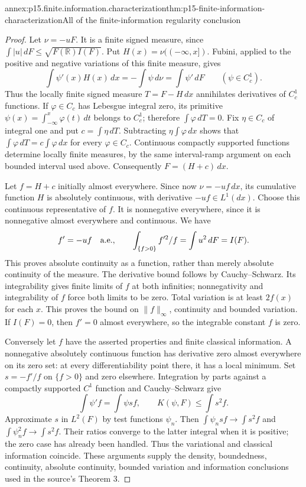 \begin{annexitem}{annex:p15.finite.information.characterization}{thm:p15-finite-information-characterization}{All of the finite-information regularity conclusion}
\begin{proof}
Let \(\nu=-uF\). It is a finite signed measure, since
\(\int|u|\,dF\leq\sqrt{F(\mathbb R)I(F)}\).
Put \(H(x)=\nu((-\infty,x])\). Fubini, applied to the positive
and negative variations of this finite measure, gives
\[
 \int\psi'(x)H(x)\,dx=-\int\psi\,d\nu
                  =\int\psi'\,dF\qquad(\psi\in C_c^1).
\]
Thus the locally finite signed measure \(T=F-H\,dx\) annihilates
derivatives of \(C_c^1\) functions. If \(\varphi\in C_c\) has
Lebesgue integral zero, its primitive
\(\psi(x)=\int_{-\infty}^x\varphi(t)\,dt\) belongs to \(C_c^1\);
therefore \(\int\varphi\,dT=0\).
Fix \(\eta\in C_c\) of integral one and put \(c=\int\eta\,dT\).
Subtracting \(\eta\int\varphi\,dx\) shows that
\(\int\varphi\,dT=c\int\varphi\,dx\) for every \(\varphi\in C_c\).
Continuous compactly supported functions determine locally finite
measures, by the same interval-ramp argument on each bounded interval
used above. Consequently \(F=(H+c)\,dx\).

Let \(f=H+c\) initially almost everywhere. Since now
\(\nu=-uf\,dx\), its cumulative function \(H\) is absolutely continuous,
with derivative \(-uf\in L^1(dx)\). Choose this continuous representative
of \(f\). It is nonnegative everywhere, since it is nonnegative almost
everywhere and continuous. We have
\[
 f'=-uf\quad\hbox{a.e.},\qquad
 \int_{\{f>0\}}f'^2/f=\int u^2\,dF=I(F).
\]
This proves absolute continuity as a function, rather than merely
absolute continuity of the measure.
The derivative bound follows by Cauchy--Schwarz. Its integrability
gives finite limits of \(f\) at both infinities; nonnegativity and
integrability of \(f\) force both limits to be zero. Total variation
is at least \(2f(x)\) for each \(x\). This proves the bound on
\(\|f\|_\infty\), continuity and bounded variation. If \(I(F)=0\),
then \(f'=0\) almost everywhere, so the integrable constant \(f\)
is zero.

Conversely let \(f\) have the asserted properties and finite classical
information. A nonnegative absolutely continuous function has
derivative zero almost everywhere on its zero set: at every
differentiability point there, it has a local minimum.
Set \(s=-f'/f\) on \(\{f>0\}\) and zero elsewhere.
Integration by parts against a compactly supported \(C^1\) function
and Cauchy--Schwarz give
\[
 \int\psi' f=\int\psi s f,\qquad
 K(\psi,F)\leq\int s^2 f .
\]
Approximate \(s\) in \(L^2(F)\) by test functions \(\psi_n\).
Then \(\int\psi_n s f\to\int s^2f\) and
\(\int\psi_n^2f\to\int s^2f\). Their ratios converge to the latter
integral when it is positive; the zero case has already been handled.
Thus the variational and classical information coincide.
These arguments supply the density, boundedness, continuity,
absolute continuity, bounded variation and information conclusions
used in the source's Theorem 3.
\end{proof}
\end{annexitem}

